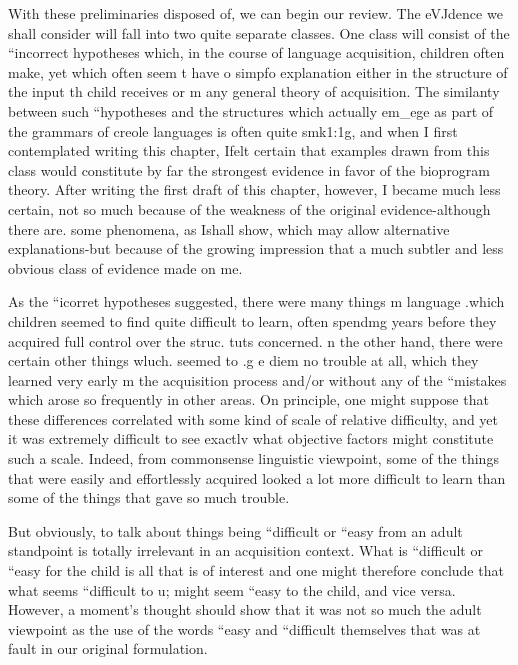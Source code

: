 

With these preliminaries disposed of, we can begin our review. The eVJdence we shall consider will fall into two quite separate classes. One class will consist of the ``incorrect hypotheses which, in the course of language acquisition, children often make, yet which often seem t have o simpfo explanation either in the structure of the input th child receives or m any general theory of acquisition. The simi\-lanty between such ``hypotheses and the structures which actually em\_ege as part of the grammars of creole languages is often quite smk1:1g, and when I first contemplated writing this chapter, Ifelt certain that examples drawn from this class would constitute by far
the strongest evidence in favor of the bioprogram theory. After writing
the first draft of this chapter, however, I became much less certain, not so much because of the weakness of the original evidence-although there are. some phenomena, as Ishall show, which may allow alternative explanations{}-but because of the growing impression that a much subtler and less obvious class of evidence made on me.

As the ``icorret hypotheses suggested, there were many things m language .which children seemed to find quite difficult to learn, often spendmg years before they acquired full control over the struc. tuts concerned. n the other hand, there were certain other things wluch. seemed to .g e diem no trouble at all, which they learned very early m the acquisition process and/or without any of the ``mistakes which arose so frequently in other areas. On principle, one might suppose that these differences correlated with some kind of scale of relative difficulty, and yet it was extremely difficult to see exactlv what objective factors might constitute such a scale. Indeed, from commonsense linguistic viewpoint, some of the things that were easily and effortlessly acquired looked a lot more difficult to learn than some of the things that gave so much trouble.

But obviously, to talk about things being ``difficult or ``easy from an adult standpoint is totally irrelevant in an acquisition context. What is ``difficult or ``easy for the child is all that is of interest and one might therefore conclude that what seems ``difficult to u; might seem ``easy to the child, and vice versa. However, a moment's
thought should show that it was not so much the adult viewpoint as the use of the words ``easy and ``difficult themselves that was at fault in our original formulation.

